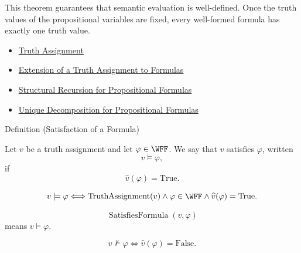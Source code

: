 \begin{remark*}[Interpretation]
This theorem guarantees that semantic evaluation is well-defined. Once the
truth values of the propositional variables are fixed, every well-formed formula
has exactly one truth value.
\end{remark*}

\begin{dependencies}
\begin{itemize}
  \item \hyperref[def:truth-assignment-propositional-logic]{Truth Assignment}
  \item \hyperref[def:extended-truth-assignment-propositional-logic]{Extension of a Truth Assignment to Formulas}
  \item \hyperref[thm:structural-recursion-propositional-formulas]{Structural Recursion for Propositional Formulas}
  \item \hyperref[thm:unique-decomposition-propositional-formulas]{Unique Decomposition for Propositional Formulas}
\end{itemize}
\end{dependencies}
\begin{definitionbox}{Definition (Satisfaction of a Formula)}
\begin{definition}
\label{def:satisfaction-propositional-formula}
Let \(v\) be a truth assignment and let \(\varphi\in\WFF\). We say that \(v\) satisfies \(\varphi\), written
\[
v\models\varphi,
\]
if
\[
\widehat v(\varphi)=\mathrm{True}.
\]
\end{definition}
\end{definitionbox}

\begin{remark*}
\[
v\models\varphi
\Longleftrightarrow
\operatorname{TruthAssignment}(v)
\land
\varphi\in\WFF
\land
\widehat v(\varphi)=\mathrm{True}.
\]
\end{remark*}

\begin{remark*}
\[
\operatorname{SatisfiesFormula}(v,\varphi)
\]
means \(v\models\varphi\).
\end{remark*}

\begin{remark*}
\[
v\not\models\varphi
\Longleftrightarrow
\widehat v(\varphi)=\mathrm{False}.
\]
\end{remark*}

